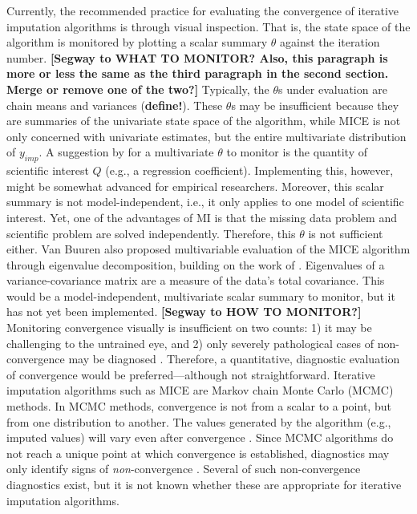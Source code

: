 \documentclass[Royal,times,sageh]{sagej}
\begin{document}
Currently, the recommended practice for evaluating the convergence of iterative imputation algorithms is through visual inspection. That is, the state space of the algorithm is monitored by plotting a scalar summary \(\theta\) against the iteration number.
\textbf{{[}Segway to WHAT TO MONITOR? Also, this paragraph is more or less the same as the third paragraph in the second section. Merge or remove one of the two?{]}} Typically, the \(\theta\)s under evaluation are chain means and variances (\textbf{define!}). These \(\theta\)s may be insufficient because they are summaries of the univariate state space of the algorithm, while MICE is not only concerned with univariate estimates, but the entire multivariate distribution of \(y_{imp}\). A suggestion by \citet{buur18} for a multivariate \(\theta\) to monitor is the quantity of scientific interest \(Q\) (e.g., a regression coefficient). Implementing this, however, might be somewhat advanced for empirical researchers. Moreover, this scalar summary is not model-independent, i.e., it only applies to one model of scientific interest. Yet, one of the advantages of MI is that the missing data problem and scientific problem are solved independently. Therefore, this \(\theta\) is not sufficient either. Van Buuren \citeyearpar[\(\S\) 4.5.2]{buur18} also proposed multivariable evaluation of the MICE algorithm through eigenvalue decomposition, building on the work of \citet{mack03}. Eigenvalues of a variance-covariance matrix are a measure of the data's total covariance. This would be a model-independent, multivariate scalar summary to monitor, but it has not yet been implemented.
\textbf{{[}Segway to HOW TO MONITOR?{]}} Monitoring convergence visually is insufficient on two counts: 1) it may be challenging to the untrained eye, and 2) only severely pathological cases of non-convergence may be diagnosed \citep[\(\S\) 6.5.2]{buur18}. Therefore, a quantitative, diagnostic evaluation of convergence would be preferred---although not straightforward. Iterative imputation algorithms such as MICE are Markov chain Monte Carlo (MCMC) methods. In MCMC methods, convergence is not from a scalar to a point, but from one distribution to another. The values generated by the algorithm (e.g., imputed values) will vary even after convergence \citep{gelm13}. Since MCMC algorithms do not reach a unique point at which convergence is established, diagnostics may only identify signs of \emph{non}-convergence \citep{hoff09}. Several of such non-convergence diagnostics exist, but it is not known whether these are appropriate for iterative imputation algorithms.
\end{document}
